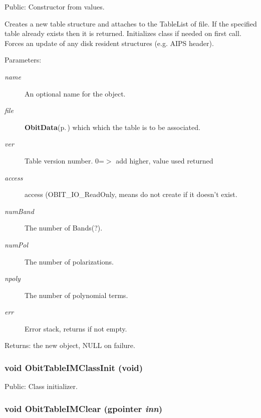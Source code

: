 Public: Constructor from values. 

Creates a new table structure and attaches to the Table\-List of file. If the specified table already exists then it is returned. Initializes class if needed on first call. Forces an update of any disk resident structures (e.g. AIPS header). \begin{Desc}
\item[Parameters:]
\begin{description}
\item[{\em name}]An optional name for the object. \item[{\em file}]{\bf Obit\-Data}{\rm (p.\,\pageref{structObitData})} which which the table is to be associated. \item[{\em ver}]Table version number. 0=$>$ add higher, value used returned \item[{\em access}]access (OBIT\_\-IO\_\-Read\-Only, means do not create if it doesn't exist. \item[{\em num\-Band}]The number of Bands(?). \item[{\em num\-Pol}]The number of polarizations. \item[{\em npoly}]The number of polynomial terms. \item[{\em err}]Error stack, returns if not empty. \end{description}
\end{Desc}
\begin{Desc}
\item[Returns:]the new object, NULL on failure. \end{Desc}
\subsubsection{\setlength{\rightskip}{0pt plus 5cm}void Obit\-Table\-IMClass\-Init (void)}\label{ObitTableIM_8c_a27}


Public: Class initializer. 

\subsubsection{\setlength{\rightskip}{0pt plus 5cm}void Obit\-Table\-IMClear (gpointer {\em inn})}\label{ObitTableIM_8c_a9}


